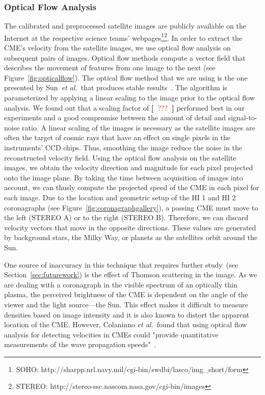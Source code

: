 \documentclass[journal]{vgtc}                %
\def\etal{\textit{et al.}}
\newcommand{\todo}[1] {\textbf{[~}\textcolor {red}{#1}\marginpar{\textcolor {red}{\centerline{{\Huge \textbf{!}}}}}\textbf{~]}}
\def\etal{\textit{et al.}}
\newcommand{\todo}[1] {\textbf{[~}\textcolor {red}{#1}\marginpar{\textcolor {red}{\centerline{{\Huge \textbf{!}}}}}\textbf{~]}}
\begin{document}
\subsubsection{Optical Flow Analysis} \label{sec:opticalflow}
The calibrated and preprocessed satellite images are publicly available on the Internet at the respective science teams' webpages\footnote{SOHO: http://sharpp.nrl.navy.mil/cgi-bin/swdbi/lasco/img\_short/form}\footnote{STEREO: http://stereo-ssc.nascom.nasa.gov/cgi-bin/images}. In order to extract the CME's velocity from the satellite images, we use optical flow analysis on subsequent pairs of images. Optical flow methods compute a vector field that describes the movement of features from one image to the next (see Figure~\ref{fig:opticalflow}). The optical flow method that we are using is the one presented by Sun~\etal\ that produces stable results~\cite{sun2010secrets}. The algorithm is parameterized by applying a linear scaling to the image prior to the optical flow analysis. We found out that a scaling factor of \todo{???} performed best in our experiments and a good compromise between the amount of detail and signal-to-noise ratio. A linear scaling of the images is necessary as the satellite images are often the target of cosmic rays that have an effect on single pixels in the instruments' CCD chips. Thus, smoothing the image reduce the noise in the reconstructed velocity field. Using the optical flow analysis on the satellite images, we obtain the velocity direction and magnitude for each pixel projected onto the image plane. By taking the time between acquisition of images into account, we can thusly compute the projected speed of the CME in each pixel for each image. Due to the location and geometric setup of the HI 1 and HI 2 coronagraphs (see Figure~\ref{fig:coronagraphgallery}), a passing CME must move to the left (STEREO A) or to the right (STEREO B). Therefore, we can discard velocity vectors that move in the opposite directions. These values are generated by background stars, the Milky Way, or planets as the satellites orbit around the Sun.

One source of inaccuracy in this technique that requires further study~(see Section~\ref{sec:futurework}) is the effect of Thomson scattering in the image. As we are dealing with a coronagraph in the visible spectrum of an optically thin plasma, the perceived brightness of the CME is dependent on the angle of the viewer and the light source---the Sun. This effect makes it difficult to measure densities based on image intensity and it is also known to distort the apparent location of the CME. However, Colaninno \etal\ found that using optical flow analysis for detecting velocities in CMEs could "provide quantitative measurements of the wave propagation speeds"~\cite{Colaninno:2006ef}.
\end{document}

